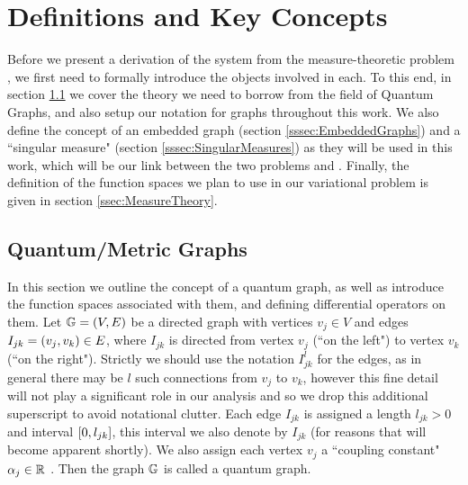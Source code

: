 \section{Definitions and Key Concepts} \label{sec:Definitions}
Before we present a derivation of the system  from the measure-theoretic problem , we first need to formally introduce the objects involved in each.
To this end, in section \ref{ssec:QuantumGraphs} we cover the theory we need to borrow from the field of Quantum Graphs, and also setup our notation for graphs throughout this work.
We also define the concept of an embedded graph (section \ref{sssec:EmbeddedGraphs}) and a ``singular measure" (section \ref{sssec:SingularMeasures}) as they will be used in this work, which will be our link between the two problems  and .
Finally, the definition of the function spaces we plan to use in our variational problem  is given in section \ref{ssec:MeasureTheory}.

\subsection{Quantum/Metric Graphs} \label{ssec:QuantumGraphs}
In this section we outline the concept of a quantum graph, as well as introduce the function spaces associated with them, and defining differential operators on them.
Let $\mathbb{G}=\left( V,E \right)$ be a directed graph with vertices $v_j\in V$ and edges $I_{jk}=\left( v_j, v_k \right)\in E$, where $I_{jk}$ is directed from vertex $v_j$ (``on the left") to vertex $v_k$ (``on the right").
Strictly we should use the notation $I_{jk}^l$ for the edges, as in general there may be $l$ such connections from $v_j$ to $v_k$, however this fine detail will not play a significant role in our analysis and so we drop this additional superscript to avoid notational clutter.
Each edge $I_{jk}$ is assigned a length $l_{jk}>0$ and interval $\left[ 0,l_{jk} \right]$, this interval we also denote by $I_{jk}$ (for reasons that will become apparent shortly).
We also assign each vertex $v_j$ a ``coupling constant" $\alpha_j\in\mathbb{R}$ .
Then the graph $\mathbb{G}$ is called a quantum graph. \newline

